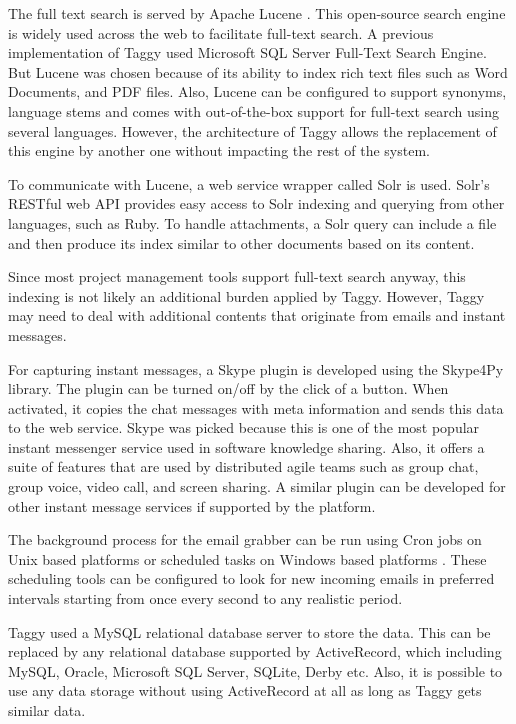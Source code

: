 The full text search is served by Apache Lucene \cite{lucene}. This open-source search engine is widely used across the web to facilitate full-text search. A previous implementation of Taggy used Microsoft SQL Server Full-Text Search Engine\cite{auto_tagging}\cite{sql_server}. But Lucene was chosen because of its ability to index rich text files such as Word Documents, and PDF files. Also, Lucene can be configured to support synonyms, language stems and comes with out-of-the-box support for full-text search using several languages. However, the architecture of Taggy allows the replacement of this engine by another one without impacting the rest of the system.

To communicate with Lucene, a web service wrapper called Solr is used\cite{solr}. Solr's RESTful web API provides easy access to Solr indexing and querying from other languages, such as Ruby. To handle attachments, a Solr query can include a file and then produce its index similar to other documents based on its content.

Since most project management tools support full-text search anyway, this indexing is not likely an additional burden applied by Taggy. However, Taggy may need to deal with additional contents that originate from emails and instant messages.

For capturing instant messages, a Skype plugin is developed using the Skype4Py library\cite{skype4py}. The plugin can be turned on/off by the click of a button. When activated, it copies the chat messages with meta information and sends this data to the web service. Skype was picked because this is one of the most popular instant messenger service used in software knowledge sharing. Also, it offers a suite of features that are used by distributed agile teams such as group chat, group voice, video call, and screen sharing. A similar plugin can be developed for other instant message services if supported by the platform.

The background process for the email grabber can be run using Cron jobs on Unix based platforms or scheduled tasks on Windows based platforms \cite{cron} \cite{scheduled_tasks}. These scheduling tools can be configured to look for new incoming emails in preferred intervals starting from once every second to any realistic period.

Taggy used a MySQL relational database server to store the data. This can be replaced by any relational database supported by ActiveRecord, which including MySQL, Oracle, Microsoft SQL Server, SQLite, Derby etc\cite{active_record}. Also, it is possible to use any data storage without using ActiveRecord at all as long as Taggy gets similar data.

